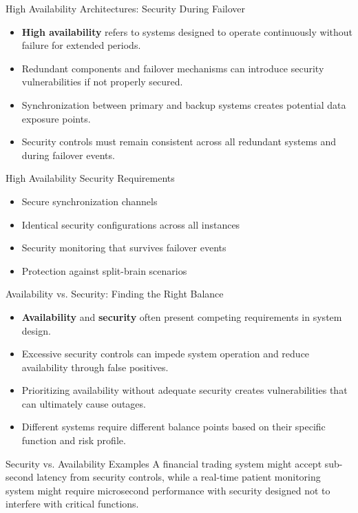 \documentclass{beamer}
\begin{document}
            \begin{frame}{High Availability Architectures: Security During Failover}
            \begin{itemize}
            \item \textbf{High availability} refers to systems designed to operate continuously without failure for extended periods.
            \item Redundant components and failover mechanisms can introduce security vulnerabilities if not properly secured.
            \item Synchronization between primary and backup systems creates potential data exposure points.
            \item Security controls must remain consistent across all redundant systems and during failover events.
            \end{itemize}
            
            \begin{block}{High Availability Security Requirements}
            \begin{itemize}
            \item Secure synchronization channels
            \item Identical security configurations across all instances
            \item Security monitoring that survives failover events
            \item Protection against split-brain scenarios
            \end{itemize}
            \end{block}
            \end{frame}
            
            \begin{frame}{Availability vs. Security: Finding the Right Balance}
            \begin{itemize}
            \item \textbf{Availability} and \textbf{security} often present competing requirements in system design.
            \item Excessive security controls can impede system operation and reduce availability through false positives.
            \item Prioritizing availability without adequate security creates vulnerabilities that can ultimately cause outages.
            \item Different systems require different balance points based on their specific function and risk profile.
            \end{itemize}
            
            \begin{exampleblock}{Security vs. Availability Examples}
            A financial trading system might accept sub-second latency from security controls, while a real-time patient monitoring system might require microsecond performance with security designed not to interfere with critical functions.
            \end{exampleblock}
            \end{frame}
            
\end{document}
